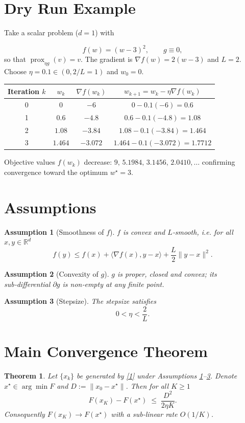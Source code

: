 \documentclass{article}
\newtheorem{theorem}{Theorem}
\newtheorem{assumption}{Assumption}
\newcommand{\prox}{\operatorname{prox}}
\newcommand{\R}{\mathbb{R}}
\begin{document}
\section*{Dry Run Example}
Take a scalar problem ($d=1$) with  

\[
f(w)=(w-3)^{2},\qquad g\equiv0,
\]
so that $\prox_{\eta g}(v)=v$.  The gradient is $\nabla f(w)=2(w-3)$ and $L=2$.
Choose $\eta=0.1\in(0,2/L=1)$ and $w_{0}=0$.

\begin{center}
\begin{tabular}{c|c|c|c}
Iteration $k$ & $w_{k}$ & $\nabla f(w_{k})$ & $w_{k+1}=w_{k}-\eta\nabla f(w_{k})$ \\ \hline
0 & $0$ & $-6$ & $0-0.1(-6)=0.6$ \\
1 & $0.6$ & $-4.8$ & $0.6-0.1(-4.8)=1.08$ \\
2 & $1.08$ & $-3.84$ & $1.08-0.1(-3.84)=1.464$ \\
3 & $1.464$ & $-3.072$ & $1.464-0.1(-3.072)=1.7712$
\end{tabular}
\end{center}

Objective values $f(w_{k})$ decrease: $9,\,5.1984,\,3.1456,\,2.0410,\dots$ confirming convergence toward the optimum $w^{\star}=3$.

\section*{Assumptions}
\begin{assumption}[Smoothness of $f$]\label{as:smooth}
$f$ is convex and $L$‑smooth, i.e. for all $x,y\in\R^{d}$
\[
f(y)\le f(x)+\langle\nabla f(x),y-x\rangle+\frac{L}{2}\|y-x\|^{2}. \tag{3}
\]
\end{assumption}

\begin{assumption}[Convexity of $g$]\label{as:convex}
$g$ is proper, closed and convex; its sub‑differential $\partial g$ is non‑empty at any finite point.
\end{assumption}

\begin{assumption}[Stepsize]\label{as:stepsize}
The stepsize satisfies 
\[
0<\eta<\frac{2}{L}. \tag{4}
\]
\end{assumption}

\section*{Main Convergence Theorem}
\begin{theorem}\label{thm:rate}
Let $\{x_{k}\}$ be generated by \eqref{1} under Assumptions \ref{as:smooth}–\ref{as:stepsize}.  
Denote $x^{\star}\in\arg\min F$ and $D:=\|x_{0}-x^{\star}\|$. Then for all $K\ge1$
\[
F(x_{K})-F(x^{\star})\;\le\;\frac{D^{2}}{2\eta K}. \tag{5}
\]
Consequently $F(x_{K})\to F(x^{\star})$ with a sub‑linear rate $O(1/K)$. 
\end{theorem}
\end{document}
